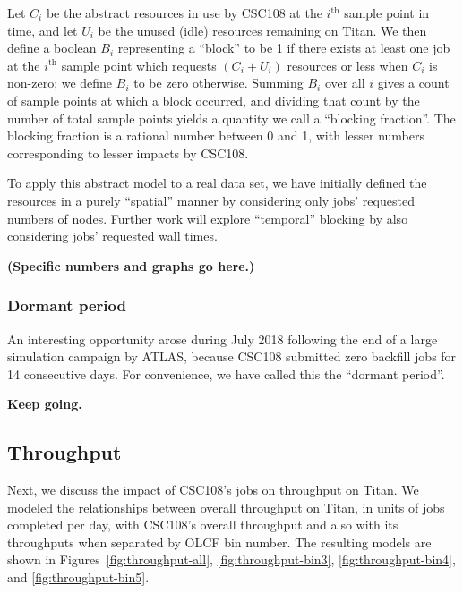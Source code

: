 Let $C_i$ be the abstract resources in use by CSC108 at the $i^{\text{th}}$
sample point in time, and let $U_i$ be the unused (idle) resources remaining on
Titan. We then define a boolean $B_i$ representing a ``block'' to be 1 if there
exists at least one job at the $i^{\text{th}}$ sample point which requests
$(C_i + U_i)$ resources or less when $C_i$ is non-zero; we define $B_i$ to be
zero otherwise. Summing $B_i$ over all $i$ gives a count of sample points at
which a block occurred, and dividing that count by the number of total sample
points yields a quantity we call a ``blocking fraction''. The blocking fraction
is a rational number between 0 and 1, with lesser numbers corresponding to
lesser impacts by CSC108.

To apply this abstract model to a real data set, we have initially defined the
resources in a purely ``spatial'' manner by considering only jobs' requested
numbers of nodes. Further work will explore ``temporal'' blocking by also
considering jobs' requested wall times.

\textbf{(Specific numbers and graphs go here.)}

\subsubsection{Dormant period}
\label{subsubsec:dormantperiod}

An interesting opportunity arose during July 2018 following the end of a large
simulation campaign by ATLAS, because CSC108 submitted zero backfill jobs for
14 consecutive days. For convenience, we have called this the ``dormant
period''.

\textbf{Keep going.}




\subsection{Throughput}
\label{subsec:throughput}


Next, we discuss the impact of CSC108's jobs on throughput on Titan. We modeled
the relationships between overall throughput on Titan, in units of jobs
completed per day, with CSC108's overall throughput and also with its
throughputs when separated by OLCF bin number. The resulting models are shown
in Figures~\ref{fig:throughput-all}, \ref{fig:throughput-bin3},
\ref{fig:throughput-bin4}, and \ref{fig:throughput-bin5}.

